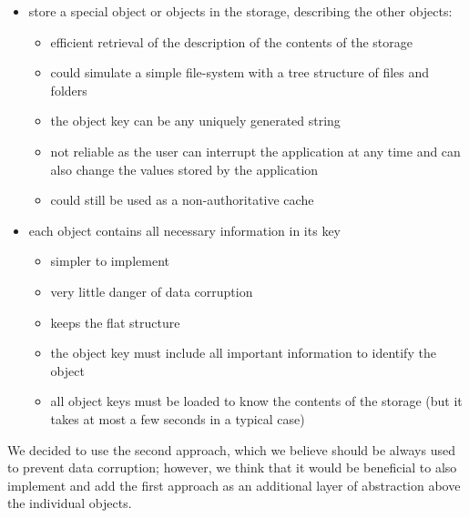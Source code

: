 \begin{itemize}

\item store a special object or objects in the storage, describing the other objects:

\begin{itemize}
\item efficient retrieval of the description of the contents of the storage
\item could simulate a simple file-system with a tree structure of files and folders
\item the object key can be any uniquely generated string
\item not reliable as the user can interrupt the application at any time and can also change the values stored by the application
\item could still be used as a non-authoritative cache
\end{itemize}

\item each object contains all necessary information in its key

\begin{itemize}
\item simpler to implement
\item very little danger of data corruption
\item keeps the flat structure
\item the object key must include all important information to identify the object
\item all object keys must be loaded to know the contents of the storage (but it takes at most a few seconds in a typical case)
\end{itemize}

\end{itemize}

We decided to use the second approach, which we believe should be always used to prevent data corruption; however, we think that it would be beneficial to also implement and add the first approach as an additional layer of abstraction above the individual objects.


